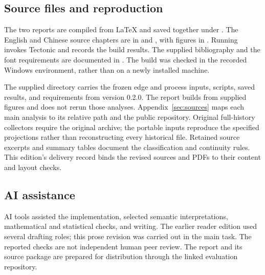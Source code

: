 \subsection{Source files and reproduction}
The two reports are compiled from LaTeX and saved together under . The English and Chinese source chapters are in  and , with figures in . Running  invokes Tectonic and records the build results. The supplied bibliography and the font requirements are documented in . The build was checked in the recorded Windows environment, rather than on a newly installed machine.

The supplied  directory carries the frozen edge and process inputs, scripts, saved results, and requirements from version 0.2.0. The report builds from supplied figures and does not rerun those analyses. Appendix~\ref{sec:sources} maps each main analysis to its relative path and the public repository. Original full-history collectors require the original archive; the portable inputs reproduce the specified projections rather than reconstructing every historical file. Retained source excerpts and summary tables document the classification and continuity rules. This edition's delivery record binds the revised sources and PDFs to their content and layout checks.

\subsection{AI assistance}
AI tools assisted the implementation, selected semantic interpretations, mathematical and statistical checks, and writing. The earlier reader edition used several drafting roles; this prose revision was carried out in the main task. The reported checks are not independent human peer review. The report and its source package are prepared for distribution through the linked evaluation repository.
